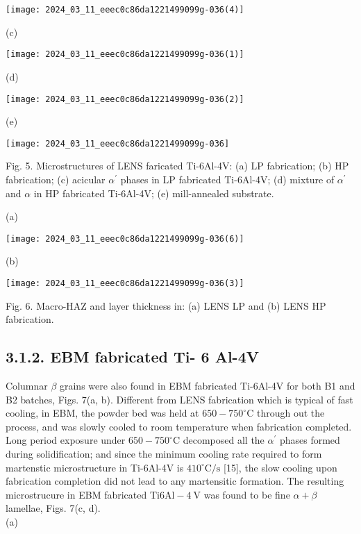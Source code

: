 \documentclass[10pt]{article}
\begin{document}
\begin{center}
\texttt{[image: 2024\_03\_11\_eeec0c86da1221499099g-036(4)]}
\end{center}

(c)

\begin{center}
\texttt{[image: 2024\_03\_11\_eeec0c86da1221499099g-036(1)]}
\end{center}

(d)

\begin{center}
\texttt{[image: 2024\_03\_11\_eeec0c86da1221499099g-036(2)]}
\end{center}

(e)

\begin{center}
\texttt{[image: 2024\_03\_11\_eeec0c86da1221499099g-036]}
\end{center}

Fig. 5. Microstructures of LENS faricated Ti-6Al-4V: (a) LP fabrication; (b) HP fabrication; (c) acicular $\alpha^{\prime}$ phases in LP fabricated Ti-6Al-4V; (d) mixture of $\alpha^{\prime}$ and $\alpha$ in HP fabricated Ti-6Al-4V; (e) mill-annealed substrate.

(a)

\begin{center}
\texttt{[image: 2024\_03\_11\_eeec0c86da1221499099g-036(6)]}
\end{center}

(b)

\begin{center}
\texttt{[image: 2024\_03\_11\_eeec0c86da1221499099g-036(3)]}
\end{center}

Fig. 6. Macro-HAZ and layer thickness in: (a) LENS LP and (b) LENS HP fabrication.

\subsection*{3.1.2. EBM fabricated Ti- 6 Al-4V}
Columnar $\beta$ grains were also found in EBM fabricated Ti-6Al-4V for both B1 and B2 batches, Figs. 7(a, b). Different from LENS fabrication which is typical of fast cooling, in EBM, the powder bed was held at $650-750^{\circ} \mathrm{C}$ through out the process, and was slowly cooled to room temperature when fabrication completed. Long period exposure under $650-750^{\circ} \mathrm{C}$ decomposed all the $\alpha^{\prime}$ phases formed during solidification; and since the minimum cooling rate required to form martenstic microstructure in Ti-6Al-4V is $410^{\circ} \mathrm{C} / \mathrm{s}$ [15], the slow cooling upon fabrication completion did not lead to any martensitic formation. The resulting microstrucure in EBM fabricated Ti$6 \mathrm{Al}-4 \mathrm{~V}$ was found to be fine $\alpha+\beta$ lamellae, Figs. 7(c, d).\\
(a)
\end{document}

